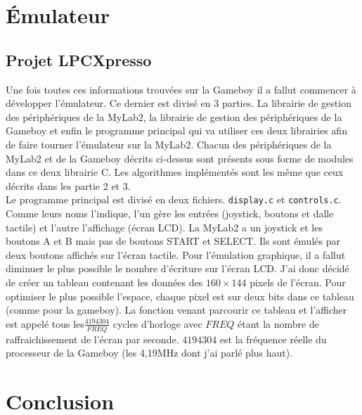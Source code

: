 \documentclass[a4paper]{article}
\begin{document}
\section{Émulateur}
\subsection{Projet LPCXpresso}
Une fois toutes ces informations trouvées sur la Gameboy il a fallut commencer
à développer l'émulateur. Ce dernier est divisé en 3 parties. La librairie de gestion
des périphériques de la MyLab2, la librairie de gestion des périphériques de la Gameboy
et enfin le programme principal qui va utiliser ces deux librairies afin de faire
tourner l'émulateur sur la MyLab2. Chacun des périphériques de la MyLab2 et de la
Gameboy décrits  ci-dessus sont présents sous forme de modules dans ce deux librairie C.
Les algorithmes implémentés sont les même que ceux décrits dans les partie 2 et 3. \\

Le programme principal est divisé en deux fichiers. \texttt{display.c}
et \texttt{controls.c}. Comme leurs noms l'indique, l'un gère les entrées
(joystick, boutons et dalle tactile) et l'autre l'affichage (écran LCD).
La MyLab2 a un joystick et les boutons A et B mais pas de boutons START et SELECT.
Ils sont émulés par deux boutons affichés sur l'écran tactile. Pour l'émulation graphique,
il a fallut diminuer le plus possible le nombre d'écriture sur l'écran LCD. J'ai
donc décidé de créer un tableau contenant les données des $160 \times 144$ pixels
de l'écran. Pour optimiser le plus possible l'espace, chaque pixel est sur deux bits
dans ce tableau (comme pour la gameboy). La fonction venant parcourir ce tableau
et l'afficher est appelé tous les$\frac{4194304}{FREQ}$ cycles d'horloge avec $FREQ$ 
étant la nombre de raffraichissement de l'écran par seconde. $4194304$ est la fréquence 
réelle du processeur de la Gameboy (les 4,19MHz dont j'ai parlé plus haut).


\section{Conclusion}
\end{document}
